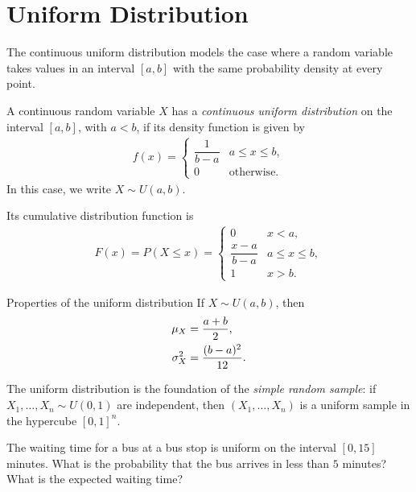 \section{Uniform Distribution}

The continuous uniform distribution models the case where a random variable takes values in an interval $[a,b]$ with the same probability density at every point.

\begin{definicion}
A continuous random variable $X$ has a \emph{continuous uniform distribution} on the interval $[a,b]$, with $a<b$, if its density function is given by
\begin{align}
 \label{eq:2.8.1}
 f(x) =
 \begin{cases}
  \dfrac{1}{b-a} & a \leq x \leq b, \\
  0 & \text{otherwise.}
 \end{cases}
\end{align}
In this case, we write $X \sim U(a,b)$.
\end{definicion}

Its cumulative distribution function is
\begin{align}
 \label{eq:2.8.2}
 F(x) = P(X \leq x) =
 \begin{cases}
  0 & x < a, \\
  \dfrac{x-a}{b-a} & a \leq x \leq b, \\
  1 & x > b.
 \end{cases}
\end{align}

{Properties of the uniform distribution} If $X \sim U(a,b)$, then
\begin{align}
 \mu_X &= \frac{a+b}{2}, \\
 \sigma_X^2 &= \frac{(b-a)^2}{12}.
\end{align}

\begin{observacion}
The uniform distribution is the foundation of the \emph{simple random sample}: if $X_1,\dots,X_n \sim U(0,1)$ are independent, then $(X_1,\dots,X_n)$ is a uniform sample in the hypercube $[0,1]^n$.
\end{observacion}

\begin{ejemplo}
 \label{exmp:2.8.1}
The waiting time for a bus at a bus stop is uniform on the interval $[0,15]$ minutes. What is the probability that the bus arrives in less than $5$ minutes? What is the expected waiting time?
\end{ejemplo}

